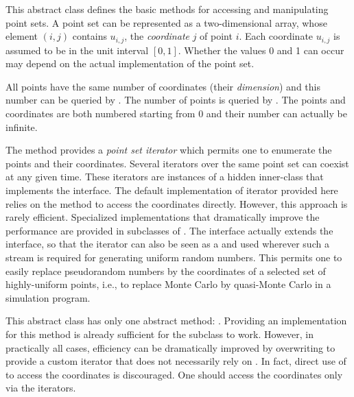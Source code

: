 
This abstract class defines the basic methods
for accessing and manipulating point sets.
A point set can be represented as a two-dimensional array, whose element
$(i,j)$ contains $u_{i,j}$, the \emph{coordinate} $j$ of point $i$.
Each coordinate $u_{i,j}$ is assumed to be in the unit interval $[0,1]$.
Whether the values 0 and 1 can occur may depend on the
actual implementation of the point set.

All points have the same number of coordinates (their \emph{dimension})
and this number can be queried by .
The number of points is queried by .
The points and coordinates are both numbered starting from 0
and their number can actually be infinite.

The  method provides a \emph{point set iterator}
which permits one to enumerate the points and their coordinates.
Several iterators over the same point set can coexist at any given time.
These iterators are instances of a hidden inner-class that implements
the  interface.
The default implementation of iterator provided here relies on
the method  to access the coordinates directly.
However, this approach is rarely efficient.
Specialized implementations that dramatically improve the performance
are provided in subclasses of .
The  interface actually extends the
 interface, so that the
iterator can also be seen as a  and used wherever
such a stream is required for generating uniform random numbers.
This permits one to easily replace pseudorandom numbers by the
coordinates of a selected set of highly-uniform points, i.e.,
to replace Monte Carlo by quasi-Monte Carlo in a simulation program.

\begin{comment}
The class also offers tools to manipulate a list of randomizations
that can be applied to this point set.
\pierre{So far, the general types of randomizations have been implemented
   as containers.  We may remove this concept of list. }
\richard{La nouvelle randomisation d'Adam rend l'ancienne liste de
 randomisations obsol\`ete: nous n'avons jamais utilis\'e l'ancienne version.}
\end{comment}

This abstract class has only one abstract method:
.
Providing an implementation for this method is already sufficient
for the subclass to work.
However, in practically all cases, efficiency can be dramatically improved by
overwriting  to provide a custom iterator that does not
necessarily rely on .
In fact, direct use of  to access the coordinates
is discouraged.
One should access the coordinates only via the iterators.

